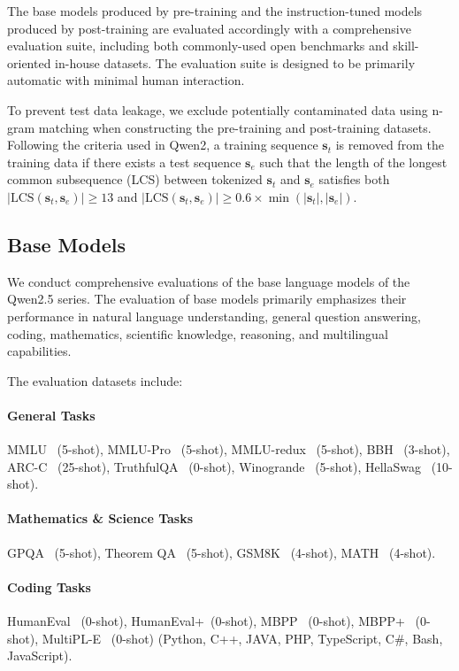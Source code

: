 \documentclass{article}
\begin{document}
The base models produced by pre-training and the instruction-tuned models produced by post-training are evaluated accordingly with a comprehensive evaluation suite, including both commonly-used open benchmarks and skill-oriented in-house datasets.
The evaluation suite is designed to be primarily automatic with minimal human interaction.

To prevent test data leakage, we exclude potentially contaminated data using n-gram matching when constructing the pre-training and post-training datasets. Following the criteria used in Qwen2, a training sequence $\mathbf{s}_t$ is removed from the training data if there exists a test sequence $\mathbf{s}_e$ such that the length of the longest common subsequence (LCS) between tokenized $\mathbf{s}_t$ and $\mathbf{s}_e$ satisfies both $|\text{LCS}(\mathbf{s}_t, \mathbf{s}_e)| \geq 13$ and $|\text{LCS}(\mathbf{s}_t, \mathbf{s}_e)| \geq 0.6 \times \min(|\mathbf{s}_t|, |\mathbf{s}_e|)$.

\subsection{Base Models}

We conduct comprehensive evaluations of the base language models of the Qwen2.5 series. 
The evaluation of base models primarily emphasizes their performance in natural language understanding, general question answering, coding, mathematics, scientific knowledge, reasoning, and multilingual capabilities.

The evaluation datasets include:

\paragraph{General Tasks} MMLU~\citep{mmlu} (5-shot), MMLU-Pro~\citep{mmlupro} (5-shot), MMLU-redux~\citep{mmluredux} (5-shot), BBH~\citep{bbh} (3-shot), ARC-C~\citep{arc} (25-shot), TruthfulQA~\citep{truthfulqa} (0-shot), Winogrande~\citep{winogrande} (5-shot), HellaSwag~\citep{hellaswag} (10-shot).

\paragraph{Mathematics \& Science Tasks} GPQA~\citep{gpqa} (5-shot), Theorem QA~\citep{theoremqa} (5-shot), GSM8K~\citep{gsm8k} (4-shot), MATH~\citep{math} (4-shot).

\paragraph{Coding Tasks} HumanEval~\citep{humaneval} (0-shot), HumanEval+~\citep{evalplus}(0-shot), MBPP~\citep{mbpp} (0-shot), MBPP+~\citep{evalplus} (0-shot), MultiPL-E~\citep{multiple} (0-shot) (Python, C++, JAVA, PHP, TypeScript, C\#, Bash, JavaScript).
\end{document}
